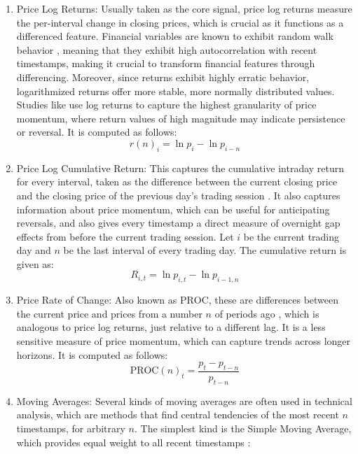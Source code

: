 \documentclass[stu,floatsintext]{apa7}
\begin{document}
\begin{enumerate}
\item Price Log Returns: Usually taken as the core signal, price log returns measure the per-interval change in closing prices, which is crucial as it functions as a differenced feature. Financial variables are known to exhibit random walk behavior \parencite{fama1970efficient}, meaning that they exhibit high autocorrelation with recent timestamps, making it crucial to transform financial features through differencing. Moreover, since returns exhibit highly erratic behavior, logarithmized returns offer more stable, more normally distributed values. Studies like \textcite{kong2020predicting} use log returns to capture the highest granularity of price momentum, where return values of high magnitude may indicate persistence or reversal. It is computed as follows:
\begin{equation}r(n)_i=\ln p_i-\ln p_{i-n}\end{equation}
\item Price Log Cumulative Return: This captures the cumulative intraday return for every interval, taken as the difference between the current closing price and the closing price of the previous day's trading session \parencite{kong2020predicting}. It also captures information about price momentum, which can be useful for anticipating reversals, and also gives every timestamp a direct measure of overnight gap effects from before the current trading session. Let $i$ be the current trading day and $n$ be the last interval of every trading day. The cumulative return is given as:
\begin{equation}R_{i,t}=\ln p_{i,t}-\ln p_{i-1,n}\end{equation}
\item Price Rate of Change: Also known as $\text{PROC}$, these are differences between the current price and prices from a number $n$ of periods ago \parencite{kong2020predicting}, which is analogous to price log returns, just relative to a different lag. It is a less sensitive measure of price momentum, which can capture trends across longer horizons. It is computed as follows:
\begin{equation}\text{PROC}(n)_t=\frac{p_t-p_{t-n}}{p_{t-n}}\end{equation}
\item Moving Averages: Several kinds of moving averages are often used in technical analysis, which are methods that find central tendencies of the most recent $n$ timestamps, for arbitrary $n$. The simplest kind is the Simple Moving Average, which provides equal weight to all recent timestamps \parencite{tanakayamawaki2007adaptive}:

\end{enumerate}
\end{document}
